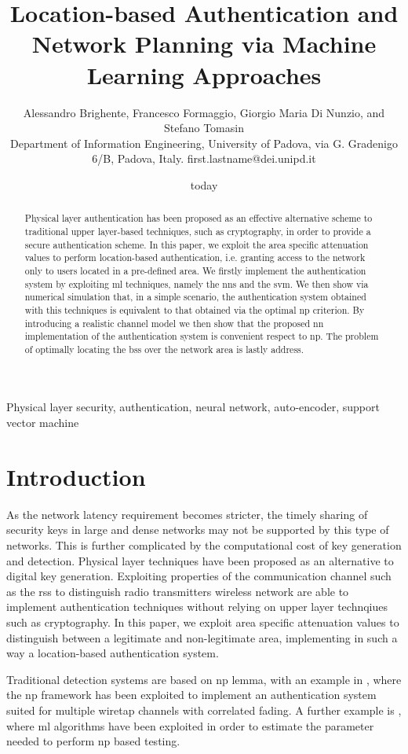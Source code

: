 \documentclass[twocolumns]{IEEEtran}
\title{Location-based Authentication and Network Planning via Machine Learning Approaches}
\author{  Alessandro Brighente, Francesco Formaggio, Giorgio Maria Di Nunzio, and  Stefano Tomasin  \\ {\small Department of Information Engineering, University of Padova, via G. Gradenigo 6/B, Padova, Italy. first.lastname@dei.unipd.it} }
\date{today}
\begin{document}
\maketitle

\begin{abstract}
Physical layer authentication has been proposed as an effective alternative scheme to traditional upper layer-based techniques, such as cryptography, in order to provide a secure authentication scheme. In this paper, we exploit the area specific attenuation values to perform location-based authentication, i.e. granting access to the network only to users located in a pre-defined area. We firstly implement the authentication system by exploiting  \ac{ml} techniques, namely the \acp{nn} and the \ac{svm}. We then show via numerical simulation that, in a simple scenario, the authentication system obtained with this techniques is equivalent to that obtained via the optimal \ac{np} criterion. By introducing a realistic channel model we then show that the proposed \ac{nn} implementation of the authentication system is convenient respect to \ac{np}. The problem of optimally locating the \acp{bs} over the network area is lastly address.
\end{abstract}

\begin{IEEEkeywords}
Physical layer security, authentication, neural network, auto-encoder, support vector machine
\end{IEEEkeywords}

\section{Introduction}
As the network latency requirement becomes stricter, the timely sharing of security keys in large and dense networks may not be supported by this type of networks. This is further complicated by the computational cost of key generation and detection. Physical layer techniques have been proposed as an alternative to digital key generation. Exploiting properties of the communication channel such as the \ac{rss} to distinguish radio transmitters wireless network are able to implement authentication techniques without relying on upper layer technqiues such as cryptography. In this paper, we exploit area specific attenuation values to distinguish between a legitimate and non-legitimate area, implementing in such a way a location-based authentication system.

Traditional detection systems are based on \ac{np} lemma, with an example in \cite{Baracca-12}, where the \ac{np} framework has been exploited to implement an authentication system suited for multiple wiretap channels with correlated fading. A further example is \cite{Pan-17}, where \ac{ml} algorithms have been exploited in order to estimate the parameter needed to perform \ac{np} based testing.
\end{document}
